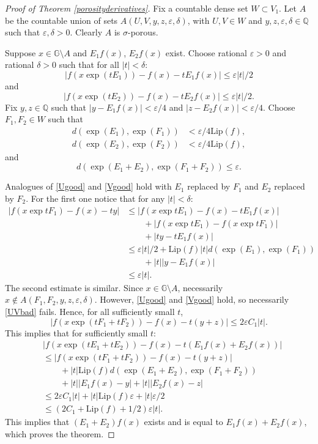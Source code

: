 \documentclass[reqno, 11pt]{amsart}
\theoremstyle{definition}
\theoremstyle{remark}
\numberwithin{theorem}{section}
\numberwithin{equation}{section}
\begin{document}
\begin{proof}[Proof of Theorem \ref{porosityderivatives}]
Fix a countable dense set $W\subset V_{1}$. Let $A$ be the countable union of sets $A(U,V,y,z,\varepsilon,\delta)$, with $U, V \in W$ and $y, z, \varepsilon, \delta \in \mathbb{Q}$ such that $\varepsilon, \delta>0$. Clearly $A$ is $\sigma$-porous.

Suppose $x\in \mathbb{G}\setminus A$ and $E_{1}f(x)$, $E_{2}f(x)$ exist. Choose rational $\varepsilon>0$ and rational $\delta>0$ such that for all $|t|<\delta$:
\[|f(x\exp(tE_{1}))-f(x)-tE_{1}f(x)|\leq \varepsilon |t|/2\]
and
\[|f(x\exp(tE_{2}))-f(x)-tE_{2}f(x)|\leq \varepsilon |t|/2.\]
Fix $y, z\in \mathbb{Q}$ such that $|y-E_{1}f(x)|< \varepsilon/4$ and $|z-E_{2}f(x)|<\varepsilon/4$. Choose $F_{1}, F_{2}\in W$ such that
\begin{align*}
d(\exp(E_{1}),\exp(F_{1})) &<\varepsilon/4\mathrm{Lip}(f),\\
d(\exp(E_{2}),\exp(F_{2})) &<\varepsilon/4\mathrm{Lip}(f),
\end{align*}
and
\[d(\exp(E_{1}+E_{2}),\exp(F_{1}+F_{2})) \leq \varepsilon.\]

Analogues of \eqref{Ugood} and \eqref{Vgood} hold with $E_{1}$ replaced by $F_{1}$ and $E_{2}$ replaced by $F_{2}$. For the first one notice that for any $|t|<\delta$:
\begin{align*}
|f(x\exp tF_{1})-f(x)-ty| &\leq |f(x\exp tE_{1})-f(x)-tE_{1}f(x)|\\
&\qquad + |f(x\exp tE_{1})-f(x\exp tF_{1})|\\
&\qquad +|ty-tE_{1}f(x)|\\
&\leq \varepsilon |t|/2 + \mathrm{Lip}(f)|t|d(\exp(E_{1}),\exp(F_{1}))\\
&\qquad +|t| |y-E_{1}f(x)|\\
&\leq \varepsilon|t|.
\end{align*} 
The second estimate is similar. Since $x\in \mathbb{G}\setminus A$, necessarily $x \notin A(F_{1},F_{2},y,z,\varepsilon,\delta)$. However, \eqref{Ugood} and \eqref{Vgood} hold, so necessarily \eqref{UVbad} fails. Hence, for all sufficiently small $t$,
\[|f(x\exp(tF_{1}+tF_{2}))-f(x)-t(y+z)|\leq 2\varepsilon C_{1}|t|.\]
This implies that for sufficiently small $t$:
\begin{align*}
& |f(x\exp(tE_{1}+tE_{2}))-f(x)-t(E_{1}f(x)+E_{2}f(x))|\\
& \leq |f(x\exp(tF_{1}+tF_{2}))-f(x)-t(y+z)|\\
&\qquad + |t|\mathrm{Lip}(f)d(\exp(E_{1}+E_{2}),\exp(F_{1}+F_{2}))\\
&\qquad + |t| |E_{1}f(x)-y| + |t| |E_{2}f(x)-z|\\
&\leq 2\varepsilon C_{1}|t| + |t|\mathrm{Lip}(f)\varepsilon + |t|\varepsilon/2\\
&\leq (2C_{1}+\mathrm{Lip}(f)+1/2)\varepsilon |t|.
\end{align*}
This implies that $(E_{1}+E_{2})f(x)$ exists and is equal to $E_{1}f(x)+E_{2}f(x)$, which proves the theorem.
\end{proof}
\end{document}
